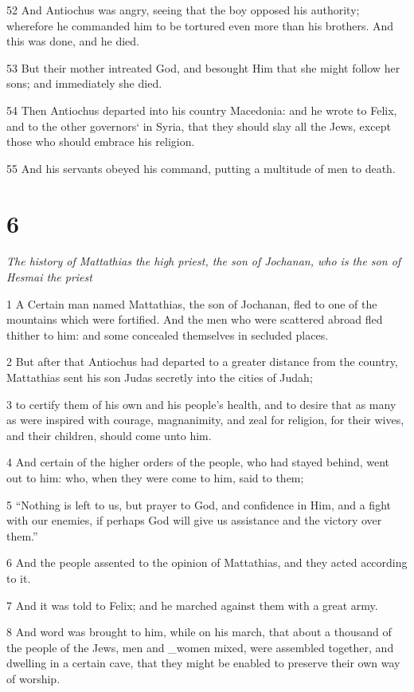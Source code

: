 52 And Antiochus was angry, seeing that the boy opposed his authority; wherefore he commanded him to be tortured even more than his brothers. And this was done, and he died. 

53 But their mother intreated God, and besought Him that she might follow her sons; and immediately she died. 

54 Then Antiochus departed into his country Macedonia: and he wrote to Felix, and to the other governors‘ in Syria, that they should slay all the Jews, except those who should embrace his religion. 

55 And his servants obeyed his command, putting a multitude of men to death. 

\chapter{6}

\par \textit{The history of Mattathias the high priest, the son of Jochanan, who is the son of Hesmai the priest}

1 A Certain man named Mattathias, the son of Jochanan, fled to one of the mountains which were fortified. And the men who were scattered abroad fled thither to him: and some concealed themselves in secluded places. 

2 But after that Antiochus had departed to a greater distance from the country, Mattathias sent his son Judas secretly into the cities of Judah; 

3 to certify them of his own and his people’s health, and to desire that as many as were inspired with courage, magnanimity, and zeal for religion, for their wives, and their children, should come unto him. 

4 And certain of the higher orders of the people, who had stayed behind, went out to him: who, when they were come to him, said to them; 

5 “Nothing is left to us, but prayer to God, and confidence in Him, and a fight with our enemies, if perhaps God will give us assistance and the victory over them.” 

6 And the people assented to the opinion of Mattathias, and they acted according to it. 

7 And it was told to Felix; and he marched against them with a great army. 

8 And word was brought to him, while on his march, that about a thousand of the people of the Jews, men and _women mixed, were assembled together, and dwelling in a certain cave, that they might be enabled to preserve their own way of worship. 

